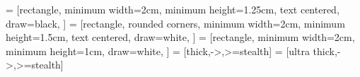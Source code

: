 \usepackage[english]{} %
\usepackage[margin=2cm]{geometry} %
\usepackage{graphicx} %
\usepackage{float} %
\usepackage{amsmath} %
\usepackage{amssymb} %
\usepackage{breqn} %
\usepackage{bm} %
\usepackage{verbatim} %
\usepackage{setspace} %
\usepackage{parskip} %
\usepackage{multicol} %
\usepackage{units} %
\usepackage{booktabs,multirow,multirow} %
\usepackage{enumerate}
\usepackage{tikz} %
	\usetikzlibrary{shapes.geometric, arrows}
	 = [rectangle, 
					  minimum width=2cm, 
					  minimum height=1.25cm,
					  text centered, 
					  draw=black, 
					 ]
	 = [rectangle, 
					      rounded corners,
					      minimum width=2cm, 
					      minimum height=1.5cm,
					      text centered, 
					      draw=white, 
					     ]
	 = [rectangle,
					      minimum width=2cm,
					      minimum height=1cm,
					      draw=white,
					      ]
	 = [thick,->,>=stealth]
	 = [ultra thick,->,>=stealth]
	
\graphicspath{ {fig/} }

\newcommand{\tab}{\-\hspace{1.5cm}}
\newcommand{\lap}{\nabla^2}
\newcommand{\p}{\partial}

